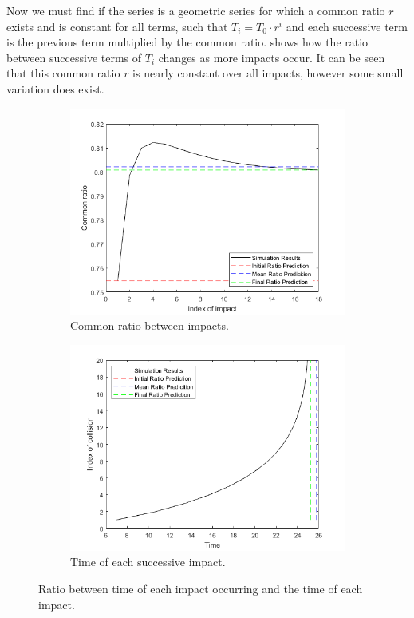 Now we must find if the series is a geometric series for which a common ratio $r$ exists and is constant for all terms, such that $T_i = T_0 \cdot r^i$ and each successive term is the previous term multiplied by the common ratio.  shows how the ratio between successive terms of $T_i$ changes as more impacts occur. It can be seen that this common ratio $r$ is nearly constant over all impacts, however some small variation does exist.
~
\begin{figure}[ht]
    \centering
    \begin{subfigure}{0.49\textwidth}
    \includegraphics[width=\textwidth]{Figures/ImpactSeries/CommonRatio.png}
    \caption{Common ratio between impacts.}
    \label{fig: ImpactOtherRatio}
    \end{subfigure}
    \begin{subfigure}{0.49\textwidth}
    \includegraphics[width=\textwidth]{Figures/ImpactSeries/FinalTime.png}
    \caption{Time of each successive impact.}
    \label{fig: ImpactOtherTimes}
    \end{subfigure}
    \caption{Ratio between time of each impact occurring and the time of each impact.}
    \label{fig: ImpactOther}
\end{figure}

